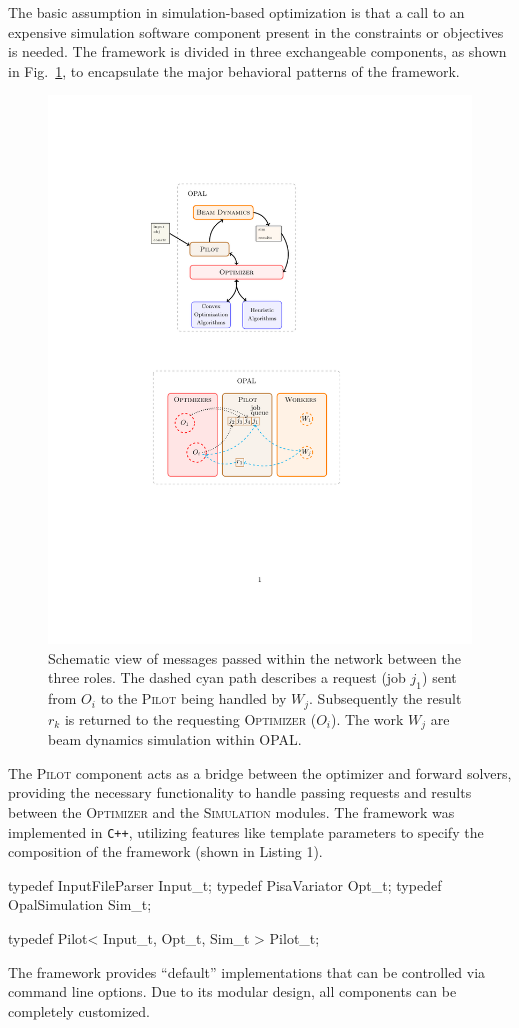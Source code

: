 \documentclass[preprint,linenumbers,amsmath,amssymb,aps,prstab]{revtex4-1}%
\begin{document}
The basic assumption in simulation-based optimization is that a
  call to an expensive simulation software component present in the
  constraints or objectives is needed.
The framework is divided in three exchangeable components, as shown in
  Fig.~\ref{fig:opt-framework-layout}, to encapsulate the major behavioral
  patterns of the framework.
%
\begin{figure}
  \centering
  \includegraphics[width=0.7\linewidth]{figures/opt-framework-layout}
  \caption{Schematic view of messages passed within the network between the
    three roles.
  The dashed cyan path describes a request (job $j_1$) sent from $O_i$ to the
  \textsc{Pilot} being handled by $W_j$. Subsequently the result $r_k$ is
  returned to the requesting \textsc{Optimizer} ($O_i$). The work $W_j$ are beam dynamics 
  simulation within OPAL.}
  \label{fig:opt-framework-layout}
\end{figure}

%
The \textsc{Pilot} component acts as a bridge between the optimizer and
  forward solvers, providing the necessary functionality to handle passing
  requests and results between the \textsc{Optimizer} and the
  \textsc{Simulation} modules.
The framework was implemented in \texttt{C++}, utilizing features like template
  parameters to specify the composition of the framework (shown in Listing 1).

\begin{code}
typedef InputFileParser	Input_t;
typedef PisaVariator	Opt_t;
typedef OpalSimulation	Sim_t;

typedef Pilot< Input_t, Opt_t, Sim_t > Pilot_t;
\end{code}
The framework provides ``default'' implementations that can be controlled via
  command line options.
Due to its modular design, all components can be completely customized.
\end{document}
